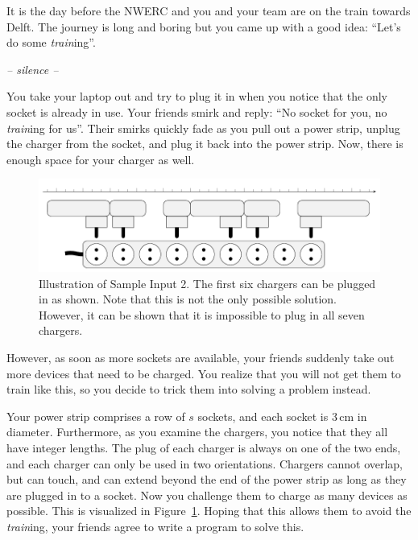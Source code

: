 It is the day before the NWERC and you and your team are on the train towards Delft.
The journey is long and boring but you came up with a good idea: ``Let's do some \emph{train}ing''.

\quad\emph{-- silence --}

You take your laptop out and try to plug it in when you notice that the only socket is already in use.
Your friends smirk and reply: ``No socket for you, no \emph{train}ing for us''.
Their smirks quickly fade as you pull out a power strip, unplug the charger from the socket, and plug it back into the power strip.
Now, there is enough space for your charger as well.


\begin{figure}[h]
    \centering
    \includegraphics{powerstrip.pdf}
    \caption{
        Illustration of Sample Input 2.
        The first six chargers can be plugged in as shown.
        Note that this is not the only possible solution.
        However, it can be shown that it is impossible to plug in all seven chargers.
    }
    \label{fig:powerstrip}
\end{figure}

However, as soon as more sockets are available, your friends suddenly take out more devices that need to be charged.
You realize that you will not get them to train like this, so you decide to trick them into solving a problem instead.

Your power strip comprises a row of $s$ sockets, and each socket is $3\,\textrm{cm}$ in diameter.
Furthermore, as you examine the chargers, you notice that they all have integer lengths.
The plug of each charger is always on one of the two ends, and each charger can
only be used in two orientations. Chargers cannot overlap, but can touch,
and can extend beyond the end of the power strip as long as they are plugged in
to a socket.
Now you challenge them to charge as many devices as possible.
This is visualized in Figure~\ref{fig:powerstrip}.
Hoping that this allows them to avoid the \emph{train}ing, your friends agree to write a program to solve this.

